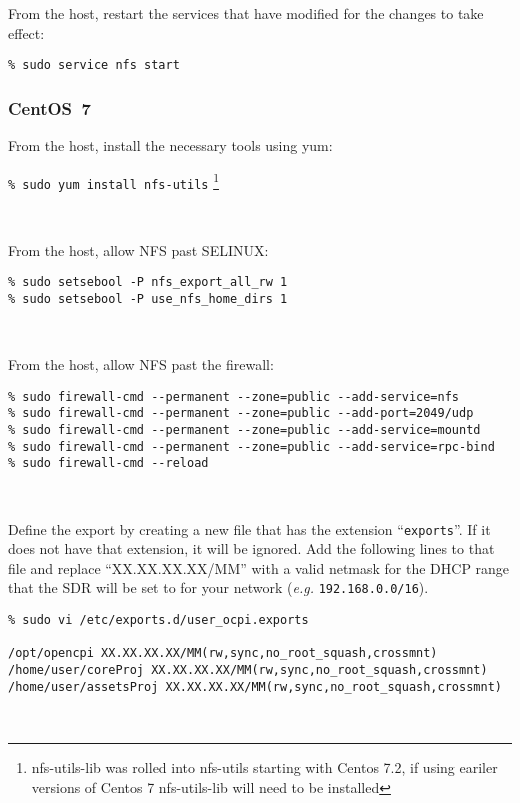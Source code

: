 \begin{minipage}{\linewidth}
From the host, restart the services that have modified for the changes to take effect:
\begin{verbatim}
% sudo service nfs start
\end{verbatim}
\end{minipage}

\subsubsection{CentOS~7}
\begin{minipage}{\linewidth}
From the host, install the necessary tools using yum:

\verb+% sudo yum install nfs-utils+ \footnote{nfs-utils-lib was rolled into nfs-utils starting with Centos 7.2, if using eariler versions of Centos 7 nfs-utils-lib will need to be installed}
\end{minipage}
~\\

\begin{minipage}{\linewidth}
From the host, allow NFS past SELINUX:
\begin{verbatim}
% sudo setsebool -P nfs_export_all_rw 1
% sudo setsebool -P use_nfs_home_dirs 1
\end{verbatim}
\end{minipage}
~\\

\begin{minipage}{\linewidth}
From the host, allow NFS past the firewall:
\begin{verbatim}
% sudo firewall-cmd --permanent --zone=public --add-service=nfs
% sudo firewall-cmd --permanent --zone=public --add-port=2049/udp
% sudo firewall-cmd --permanent --zone=public --add-service=mountd
% sudo firewall-cmd --permanent --zone=public --add-service=rpc-bind
% sudo firewall-cmd --reload
\end{verbatim}
\end{minipage}
~\\

\begin{minipage}{\linewidth}
Define the export by creating a new file that has the extension ``\texttt{exports}''. If it does not have that extension, it will be ignored.  Add the following lines to that file and replace ``XX.XX.XX.XX/MM'' with a valid netmask for the DHCP range that the SDR will be set to for your network (\textit{e.g.} \texttt{192.168.0.0/16}).
\begin{verbatim}
% sudo vi /etc/exports.d/user_ocpi.exports

/opt/opencpi XX.XX.XX.XX/MM(rw,sync,no_root_squash,crossmnt)
/home/user/coreProj XX.XX.XX.XX/MM(rw,sync,no_root_squash,crossmnt)
/home/user/assetsProj XX.XX.XX.XX/MM(rw,sync,no_root_squash,crossmnt)
\end{verbatim}
\end{minipage}
~\\

